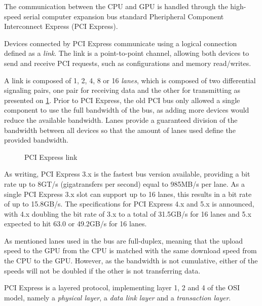 The communication between the CPU and GPU is handled through the high-speed serial computer expansion bus standard Pheripheral Component Interconnect Express (PCI Express).

Devices connected by PCI Express communicate using a logical connection defined as a \textit{link}.
The link is a point-to-point channel, allowing both devices to send and receive PCI requests, such as configurations and memory read/writes.

A link is composed of 1, 2, 4, 8 or 16 \textit{lanes}, which is composed of two differential signaling pairs, one pair for receiving data and the other for transmitting as presented on \cref{fig:hw-pci-express}.
Prior to PCI Express, the old PCI bus only allowed a single component to use the full bandwidth of the bus, as adding more devices would reduce the available bandwidth.
Lanes provide a guaranteed division of the bandwidth between all devices so that the amount of lanes used define the provided bandwidth.

\begin{figure}[ht]
	\centering
	\caption{PCI Express link}
	\label{fig:hw-pci-express}
\end{figure}



As writing, PCI Express 3.x is the fastest bus version available, providing a bit rate up to 8GT/s (gigatransfers per second) equal to 985MB/s per lane.
As a single PCI Express 3.x slot can support up to 16 lanes, this results in a bit rate of up to 15.8GB/s.
The specifications for PCI Express 4.x and 5.x is announced, with 4.x doubling the bit rate of 3.x to a total of 31.5GB/s for 16 lanes and 5.x expected to hit 63.0 or 49.2GB/s for 16 lanes.

As mentioned lanes used in the bus are full-duplex, meaning that the upload speed to the GPU from the CPU is matched with the same download speed from the CPU to the GPU.
However, as the bandwidth is not cumulative, either of the speeds will not be doubled if the other is not transferring data.

PCI Express is a layered protocol, implementing layer 1, 2 and 4 of the OSI model, namely a \textit{physical layer},  a \textit{data link layer} and a \textit{transaction layer}.

